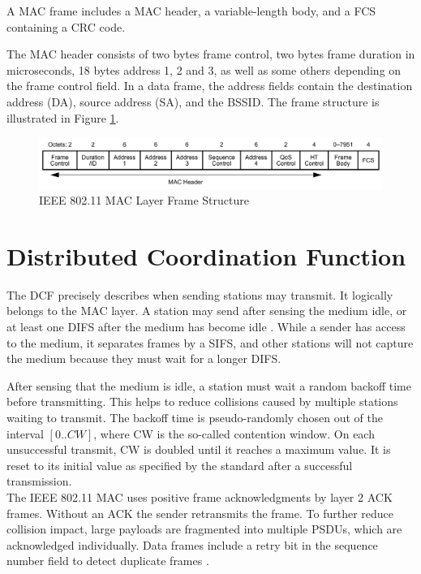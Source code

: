 A \gls{MAC} frame includes a \gls{MAC} header, a variable-length body, and a \gls{FCS} containing a \gls{CRC} code.

The \gls{MAC} header consists of two bytes frame control, two bytes frame duration in microseconds, 18 bytes address 1, 2 and 3, as well as some others depending on the frame control field. In a data frame, the address fields contain the destination address (DA), source address (SA), and the \gls{BSSID}. The frame structure is illustrated in Figure \ref{fig:mac-format}.

\begin{figure}[H]
	\centering
	\includegraphics[width=\textwidth]{gfx/images/mac-format}
	\caption[IEEE 802.11 MAC Layer Frame Structure]{IEEE 802.11 MAC Layer Frame Structure \cite{ieee2012}}
	\label{fig:mac-format}
\end{figure}



\section{Distributed Coordination Function}\label{sec:dcf}

The \gls{DCF} precisely describes when sending stations may transmit. It logically belongs to the \gls{MAC} layer. A station may send after sensing the medium idle, or at least one \gls{DIFS} after the medium has become idle \cite{bianchi2000}. While a sender has access to the medium, it separates frames by a \gls{SIFS}, and other stations will not capture the medium because they must wait for a longer \gls{DIFS}.

After sensing that the medium is idle, a station must wait a random backoff time before transmitting. This helps to reduce collisions caused by multiple stations waiting to transmit. The backoff time is pseudo-randomly chosen out of the interval $[0..CW]$, where CW is the so-called contention window. On each unsuccessful transmit, CW is doubled until it reaches a maximum value. It is reset to its initial value as specified by the standard after a successful transmission.\\

The \gls{IEEE} 802.11 \gls{MAC} uses positive frame acknowledgments by layer 2 \gls{ACK} frames. Without an \gls{ACK} the sender retransmits the frame. To further reduce collision impact, large payloads are fragmented into multiple \glspl{PSDU}, which are acknowledged individually. Data frames include a retry bit in the sequence number field to detect duplicate frames \cite{perahia2013}.\\

